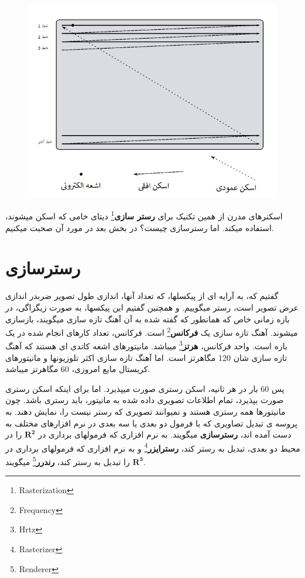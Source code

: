 \documentclass[14pt,a4paper]{memoir}
\begin{document}
 
	 \begin{figure}[H]
	 	\centering
	 	\includegraphics[scale=0.6]{RasterScan}
	 \end{figure}
	 
	 
	 اسکنرهای مدرن از همین تکنیک برای \textbf{رستر سازی}\footnote{Rasterization} دیتای خامی که اسکن میشوند، استفاده میکند. اما رسترسازی چیست؟ در بخش بعد در مورد آن صحبت میکنیم.
	 
	 \section{رسترسازی}\label{rasterize}
	 
	 
	 گفتیم که، به آرایه ای از پیکسلها، که تعداد آنها، اندازی طول تصویر ضربدر اندازی عرض تصویر است، رستر میگوییم. و همچنین گفتیم این پیکسها، به صورت زیگزاگی، در بازه زمانی خاص که همانطور که گفته شده به آن آهنگ تازه سازی میگویند، بازسازی میشوند. آهنگ تازه سازی یک \textbf{فرکانس}\footnote{Frequency} است. فرکانس، تعداد کارهای انجام شده در یک بازه است. واحد فرکانس، \textbf{هرتز}\footnote{Hrtz} میباشد. مانیتورهای اشعه کاتدی ای هستند که آهنگ تازه سازی شان 120 مگاهرتز است. اما آهنگ تازه سازی اکثر تلوزیونها و مانیتورهای کریستال مایع امروزی، 60 مگاهرتز میباشد.
	 
	 پس 60 بار در هر ثانیه، اسکن رستری صورت میپذیرد. اما برای اینکه اسکن رستری صورت بپذیرد، تمام اطلاعات تصویری داده شده به مانیتور، باید رستری باشد. چون مانیتورها همه رستری هستند و نمیوانند تصویری که رستر نیست را، نمایش دهند. به پروسه ی تبدیل تصاویری که با فرمول دو بعدی یا سه بعدی در نرم افزارهای مختلف به دست آمده اند، \textbf{رسترسازی} میگویند. به نرم افزاری که فرمولهای برداری در $ \mathbf{R^2} $ را در محیط دو بعدی، تبدیل به رستر کند، \textbf{رسترایزر}\footnote{Rasterizer} و به نرم افزاری که فرمولهای برداری در $ \mathbf{R^3} $ را تبدیل به رستر کند، \textbf{رندرر}\footnote{Renderer} میگویند.
	 
\end{document}
